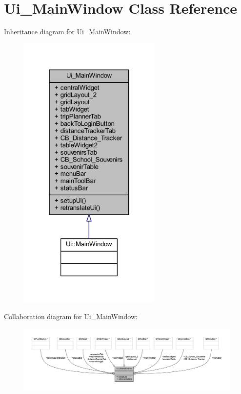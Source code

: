 \hypertarget{class_ui___main_window}{}\section{Ui\+\_\+\+Main\+Window Class Reference}
\label{class_ui___main_window}


Inheritance diagram for Ui\+\_\+\+Main\+Window\+:\nopagebreak
\begin{figure}[H]
\begin{center}
\leavevmode
\includegraphics[width=202pt]{class_ui___main_window__inherit__graph}
\end{center}
\end{figure}


Collaboration diagram for Ui\+\_\+\+Main\+Window\+:\nopagebreak
\begin{figure}[H]
\begin{center}
\leavevmode
\includegraphics[width=350pt]{class_ui___main_window__coll__graph}
\end{center}
\end{figure}
